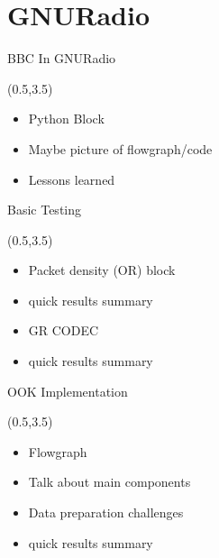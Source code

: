 \documentclass[xcolor=x11names,compress,handout]{beamer}
\begin{document}
\section{GNURadio}
\begin{frame}{BBC In GNURadio}

	\begin{textblock}{14.5}(0.5,3.5)
		\begin{itemize}
			\item Python Block
			\item Maybe picture of flowgraph/code
			\item Lessons learned
		\end{itemize}
	\end{textblock}
\end{frame}


\begin{frame}{Basic Testing}

	\begin{textblock}{14.5}(0.5,3.5)
		\begin{itemize}
			\item Packet density (OR) block
			\item quick results summary
			\item GR CODEC 
			\item quick results summary
		\end{itemize}
	\end{textblock}
\end{frame}


\begin{frame}{OOK Implementation}

	\begin{textblock}{14.5}(0.5,3.5)
		\begin{itemize}
			\item Flowgraph
			\item Talk about main components
			\item Data preparation challenges
			\item quick results summary
		\end{itemize}
	\end{textblock}
\end{frame}

\end{document}
